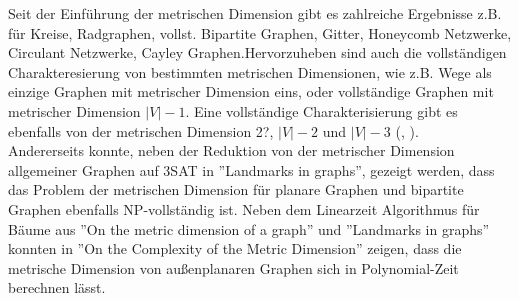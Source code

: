 Seit der Einführung der metrischen Dimension gibt es zahlreiche Ergebnisse z.B. für Kreise, Radgraphen, vollst. Bipartite Graphen, Gitter, Honeycomb Netzwerke, Circulant Netzwerke, Cayley Graphen.\newline\newline Hervorzuheben sind auch die vollständigen Charakteresierung von bestimmten metrischen Dimensionen, wie z.B. Wege als einzige Graphen mit metrischer Dimension eins, oder vollständige Graphen mit metrischer Dimension $|V|-1$. Eine vollständige Charakterisierung gibt es ebenfalls von der metrischen Dimension 2?, $|V|-2$ und $|V|-3$ (\cite{n-31}, \cite{n-32}).\\Andererseits konnte, neben der Reduktion von der metrischer Dimension allgemeiner Graphen auf 3SAT in ''Landmarks in graphs''\cite{landmarks}, gezeigt werden, dass das Problem der metrischen Dimension für planare Graphen \cite{aussenplanar} und bipartite Graphen\cite{bipartitnp} ebenfalls NP-vollständig ist. Neben dem Linearzeit Algorithmus für Bäume aus ''On the metric dimension of a graph''\cite{harary} und ''Landmarks in graphs'' \cite{landmarks} konnten in ''On the Complexity of the Metric Dimension''\cite{aussenplanar} zeigen, dass die metrische Dimension von außenplanaren Graphen sich in Polynomial-Zeit berechnen lässt.\newline\newline

